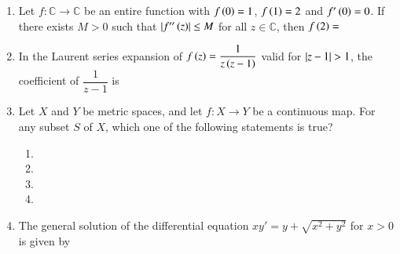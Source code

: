 \documentclass[journal,12pt,onecolumn]{IEEEtran}
\theoremstyle{remark}
\begin{document}
\begin{enumerate}[start=10]
\item Let $f\colon \mathbb{C}\to \mathbb{C}$ be an entire function with $f\left(0\right)=1$, $f\left(1\right)=2$ and $f'\left(0\right)=0$. If there exists $M>0$ such that $\left\vert f''\left(z\right)\right\vert\le M$ for all $z\in \mathbb{C}$, then $f\left(2\right)=$ 

\hfill{}

\begin{enumerate}
\end{enumerate}

\item In the Laurent series expansion of $f\left(z\right)=\dfrac{1}{z\left(z-1\right)}$ valid for $\left\vert z-1\right\vert>1$, the coefficient of $\dfrac{1}{z-1}$ is

\hfill{}

\begin{enumerate}
\end{enumerate}

\item Let $X$ and $Y$ be metric spaces, and let $f\colon X\to Y$ be a continuous map. For any subset $S$ of $X$, which one of the following statements is true? \hfill{}

\begin{enumerate}

\item {}
\item {}
\item {}
\item {}

\end{enumerate}

\item The general solution of the differential equation $x y'= y+\sqrt{x^{2}+y^{2}}$ for $x>0$ is given by \newline {}


\end{enumerate}
\end{document}

